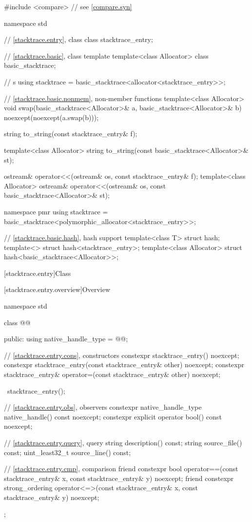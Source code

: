 %
\begin{codeblock}
#include <compare>              // see \ref{compare.syn}

namespace std {
  // \ref{stacktrace.entry}, class 
  class stacktrace_entry;

  // \ref{stacktrace.basic}, class template 
  template<class Allocator>
    class basic_stacktrace;

  //  s
  using stacktrace = basic_stacktrace<allocator<stacktrace_entry>>;

  // \ref{stacktrace.basic.nonmem}, non-member functions
  template<class Allocator>
    void swap(basic_stacktrace<Allocator>& a, basic_stacktrace<Allocator>& b)
      noexcept(noexcept(a.swap(b)));

  string to_string(const stacktrace_entry& f);

  template<class Allocator>
    string to_string(const basic_stacktrace<Allocator>& st);

  ostream& operator<<(ostream& os, const stacktrace_entry& f);
  template<class Allocator>
    ostream& operator<<(ostream& os, const basic_stacktrace<Allocator>& st);

  namespace pmr {
    using stacktrace = basic_stacktrace<polymorphic_allocator<stacktrace_entry>>;
  }

  // \ref{stacktrace.basic.hash}, hash support
  template<class T> struct hash;
  template<> struct hash<stacktrace_entry>;
  template<class Allocator> struct hash<basic_stacktrace<Allocator>>;
}
\end{codeblock}

[stacktrace.entry]{Class }

[stacktrace.entry.overview]{Overview}

\begin{codeblock}
namespace std {
  class @@ {
  public:
    using native_handle_type = @@;

    // \ref{stacktrace.entry.cons}, constructors
    constexpr stacktrace_entry() noexcept;
    constexpr stacktrace_entry(const stacktrace_entry& other) noexcept;
    constexpr stacktrace_entry& operator=(const stacktrace_entry& other) noexcept;

    ~stacktrace_entry();

    // \ref{stacktrace.entry.obs}, observers
    constexpr native_handle_type native_handle() const noexcept;
    constexpr explicit operator bool() const noexcept;

    // \ref{stacktrace.entry.query}, query
    string description() const;
    string source_file() const;
    uint_least32_t source_line() const;

    // \ref{stacktrace.entry.cmp}, comparison
    friend constexpr bool operator==(const stacktrace_entry& x,
                                     const stacktrace_entry& y) noexcept;
    friend constexpr strong_ordering operator<=>(const stacktrace_entry& x,
                                                 const stacktrace_entry& y) noexcept;
  };
}
\end{codeblock}

